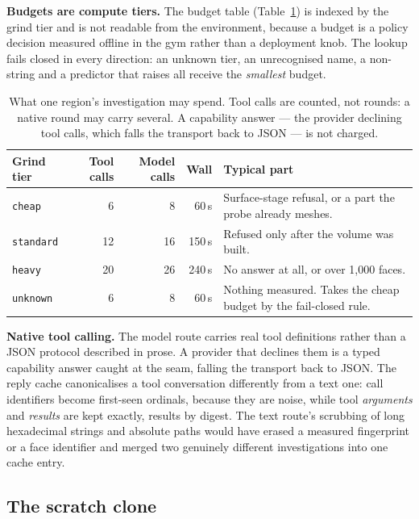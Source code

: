 \documentclass[10pt,onecolumn]{article}
\newcommand{\topic}[1]{\textbf{#1.}\hspace{0.5em}\ignorespaces}
\newcommand{\code}[1]{\texttt{\small #1}}
\begin{document}
\topic{Budgets are compute tiers} The budget table (Table~\ref{tab:budget}) is indexed by the grind
tier and is not readable from the environment, because a budget is a policy decision measured
offline in the gym rather than a deployment knob. The lookup fails closed in every direction: an
unknown tier, an unrecognised name, a non-string and a predictor that raises all receive the
\emph{smallest} budget.

\begin{table}[h]
\centering
\caption{What one region's investigation may spend. Tool calls are counted, not rounds: a native
round may carry several. A capability answer --- the provider declining tool calls, which falls the
transport back to JSON --- is not charged.}
\label{tab:budget}
\footnotesize
\begin{tabularx}{\textwidth}{@{}l r r r X@{}}
\toprule
\textbf{Grind tier} & \textbf{Tool calls} & \textbf{Model calls} & \textbf{Wall} & \textbf{Typical part}\\
\midrule
\code{cheap}    &  6 &  8 &  60\,s & Surface-stage refusal, or a part the probe already meshes.\\
\code{standard} & 12 & 16 & 150\,s & Refused only after the volume was built.\\
\code{heavy}    & 20 & 26 & 240\,s & No answer at all, or over 1{,}000 faces.\\
\code{unknown}  &  6 &  8 &  60\,s & Nothing measured. Takes the cheap budget by the fail-closed rule.\\
\bottomrule
\end{tabularx}
\end{table}

\topic{Native tool calling} The model route carries real tool definitions rather than a JSON
protocol described in prose. A provider that declines them is a typed capability answer caught at
the seam, falling the transport back to JSON. The reply cache canonicalises a tool conversation
differently from a text one: call identifiers become first-seen ordinals, because they are noise,
while tool \emph{arguments} and \emph{results} are kept exactly, results by digest. The text
route's scrubbing of long hexadecimal strings and absolute paths would have erased a measured
fingerprint or a face identifier and merged two genuinely different investigations into one cache
entry.

\subsection{The scratch clone}\label{sec:scratch}
\end{document}
